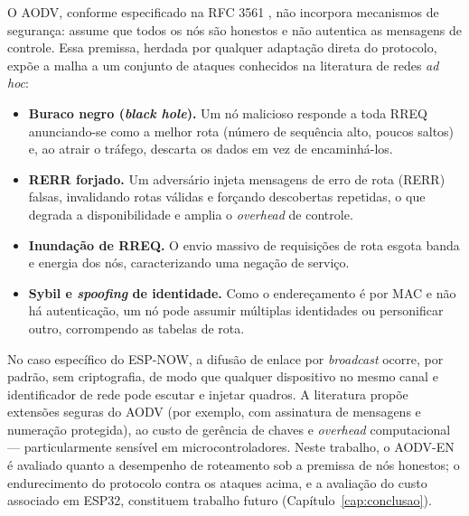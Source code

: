 O AODV, conforme especificado na RFC 3561 \cite{perkins2003}, não
incorpora mecanismos de segurança: assume que todos os nós são honestos e
não autentica as mensagens de controle. Essa premissa, herdada por
qualquer adaptação direta do protocolo, expõe a malha a um conjunto de
ataques conhecidos na literatura de redes \emph{ad hoc}:

\begin{itemize}
\item \textbf{Buraco negro (\emph{black hole}).} Um nó malicioso responde
  a toda RREQ anunciando-se como a melhor rota (número de sequência alto,
  poucos saltos) e, ao atrair o tráfego, descarta os dados em vez de
  encaminhá-los.
\item \textbf{RERR forjado.} Um adversário injeta mensagens de erro de
  rota (RERR) falsas, invalidando rotas válidas e forçando descobertas
  repetidas, o que degrada a disponibilidade e amplia o \emph{overhead} de
  controle.
\item \textbf{Inundação de RREQ.} O envio massivo de requisições de rota
  esgota banda e energia dos nós, caracterizando uma negação de serviço.
\item \textbf{Sybil e \emph{spoofing} de identidade.} Como o endereçamento
  é por MAC e não há autenticação, um nó pode assumir múltiplas
  identidades ou personificar outro, corrompendo as tabelas de rota.
\end{itemize}

No caso específico do ESP-NOW, a difusão de enlace por \emph{broadcast}
ocorre, por padrão, sem criptografia, de modo que qualquer dispositivo no
mesmo canal e identificador de rede pode escutar e injetar quadros. A
literatura propõe extensões seguras do AODV (por exemplo, com assinatura
de mensagens e numeração protegida), ao custo de gerência de chaves e
\emph{overhead} computacional --- particularmente sensível em
microcontroladores. Neste trabalho, o AODV-EN é avaliado quanto a
desempenho de roteamento sob a premissa de nós honestos; o endurecimento
do protocolo contra os ataques acima, e a avaliação do custo associado em
ESP32, constituem trabalho futuro (Capítulo~\ref{cap:conclusao}).
